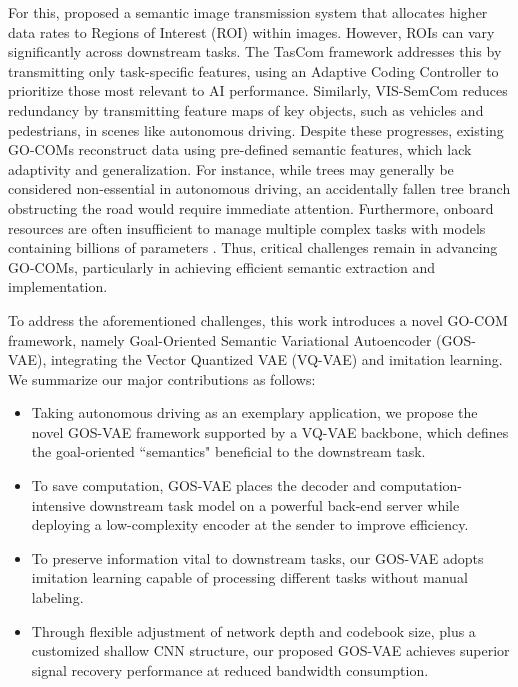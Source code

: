 For this, \cite{wu2024semantic} proposed a semantic image transmission system that allocates higher data rates to Regions of Interest (ROI) within images. However, ROIs can vary significantly across downstream tasks. The TasCom framework \cite{fu2024generative} addresses this by transmitting only task-specific features, using an Adaptive Coding Controller to prioritize those most relevant to AI performance. Similarly, VIS-SemCom \cite{lv2024importance} reduces redundancy by transmitting feature maps of key objects, such as vehicles and pedestrians, in scenes like autonomous driving. Despite these progresses, existing GO-COMs reconstruct data using pre-defined semantic features, which lack adaptivity and generalization. For instance, while trees may generally be considered non-essential in autonomous driving, an accidentally fallen tree branch obstructing the road would require immediate attention. Furthermore, onboard resources are often insufficient to manage multiple complex tasks with models containing billions of parameters \cite{achiam2023gpt, touvron2023llama, liu2024visual}. Thus, critical challenges remain in advancing GO-COMs, particularly in achieving efficient semantic extraction and implementation.

To address the aforementioned challenges, this work introduces a novel GO-COM framework, namely Goal-Oriented Semantic Variational Autoencoder (GOS-VAE), integrating the Vector Quantized VAE (VQ-VAE) and imitation learning. 
We summarize our major contributions 
as follows:

\begin{itemize}
  \item Taking autonomous driving as an exemplary application, we propose the novel GOS-VAE framework supported
  by a VQ-VAE backbone, which defines the goal-oriented ``semantics" beneficial to the downstream task.
  \item To save computation, GOS-VAE places
  the decoder and computation-intensive downstream task model on a powerful back-end server while deploying a low-complexity encoder at the sender to improve efficiency.
  \item To preserve information vital
  to downstream tasks, our GOS-VAE
adopts imitation learning capable of processing different tasks
without manual labeling.
  \item Through flexible adjustment of network depth and codebook size, plus 
  a customized shallow CNN structure, our proposed GOS-VAE achieves superior
 signal recovery performance at reduced bandwidth
  consumption.
\end{itemize}






%